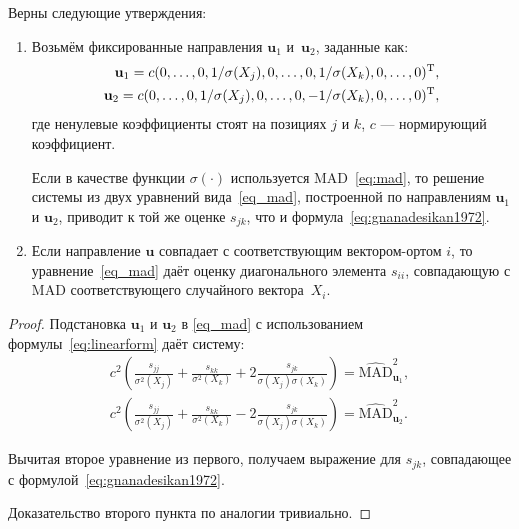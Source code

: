 \begin{proposition}
Верны следующие утверждения:
\begin{enumerate}
    \item Возьмём фиксированные направления $\mathbf{u}_1$ и~$\mathbf{u}_2$, заданные как:
    \begin{align*}
    \mathbf{u}_1 = c (0, \ldots, 0, 1/\sigma(X_j), 0, \ldots, 0, 1/\sigma(X_k), 0, \ldots, 0)^{\mathrm{T}}, \\
    \mathbf{u}_2 = c (0, \ldots, 0, 1/\sigma(X_j), 0, \ldots, 0, -1/\sigma(X_k), 0, \ldots, 0)^{\mathrm{T}},
    \end{align*}
    где ненулевые коэффициенты стоят на позициях $j$ и $k$, $c$ --- нормирующий коэффициент.

  Если в качестве функции $\sigma(\cdot)$ используется MAD~\eqref{eq:mad}, то решение системы из двух уравнений вида~\eqref{eq_mad}, построенной по направлениям $\mathbf{u}_1$ и $\mathbf{u}_2$, приводит к той же оценке $s_{j k}$, что и формула~\eqref{eq:gnanadesikan1972}.

    \item Если направление $\mathbf{u}$ совпадает с соответствующим вектором-ортом $i$, то уравнение~\eqref{eq_mad} даёт оценку диагонального элемента $s_{ii}$, совпадающую с MAD соответствующего случайного вектора~$X_i$.
\end{enumerate}
\end{proposition}
\begin{proof}
    Подстановка $\mathbf{u}_1$ и $\mathbf{u}_2$ в \eqref{eq_mad} с использованием формулы~\eqref{eq:linearform} даёт систему:
    \begin{align*}
        c^2 \left(\frac{s_{jj}}{\sigma^2(X_j)} + \frac{s_{kk}}{\sigma^2(X_k)} + 2 \frac{s_{jk}}{\sigma(X_j) \sigma(X_k)} \right) = \widehat{\text{MAD}}^2_{\mathbf{u}_1}, \\
        c^2 \left(\frac{s_{jj}}{\sigma^2(X_j)} + \frac{s_{k k}}{\sigma^2(X_k)} - 2 \frac{s_{jk}}{\sigma(X_j) \sigma(X_k)} \right) = \widehat{\text{MAD}}^2_{\mathbf{u}_2}.
    \end{align*}
    
    Вычитая второе уравнение из первого, получаем выражение для $s_{jk}$, совпадающее с формулой~\eqref{eq:gnanadesikan1972}.

    Доказательство второго пункта по аналогии тривиально.
\end{proof}


